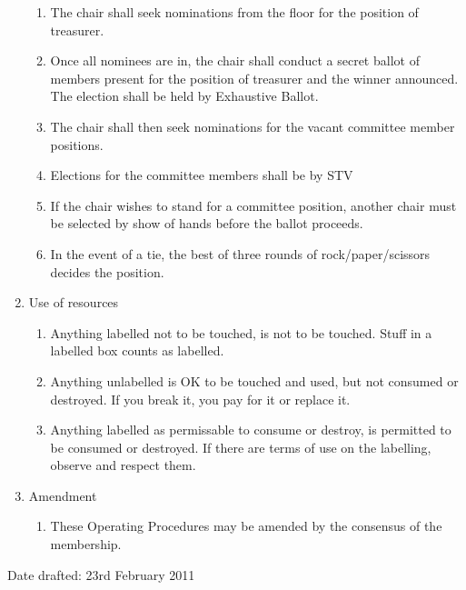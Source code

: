 \documentclass{article}
\begin{document}
\begin{enumerate}
\begin{enumerate}
  \item The chair shall seek nominations from the floor for the
    position of treasurer.
  \item Once all nominees are in, the chair shall conduct a secret
    ballot of members present for the position of treasurer and the
    winner announced. The election shall be held by Exhaustive Ballot.
  \item The chair shall then seek nominations for the vacant committee
    member positions.
  \item Elections for the committee members shall be by STV
  \item If the chair wishes to stand for a committee position, another
    chair must be selected by show of hands before the ballot proceeds.
  \item In the event of a tie, the best of three rounds of
    rock/paper/scissors decides the position.
  \end{enumerate}
\item Use of resources
  \begin{enumerate}
  \item Anything labelled not to be touched, is not to be
    touched. Stuff in a labelled box counts as labelled.
  \item Anything unlabelled is OK to be touched and used, but not
    consumed or destroyed. If you break it, you pay for it or replace
    it.
  \item Anything labelled as permissable to consume or destroy, is
    permitted to be consumed or destroyed. If there are terms of use
    on the labelling, observe and respect them.
  \end{enumerate}
\item Amendment
  \begin{enumerate}
  \item These Operating Procedures may be amended by the consensus of
    the membership.
  \end{enumerate} %
  
\end{enumerate}
\bigskip
\begin{changebar}
Date drafted: 23rd February 2011
\end{changebar}
\end{document}
